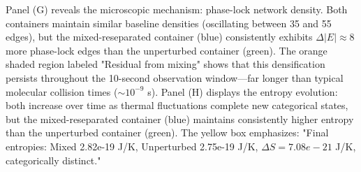 \documentclass[twocolumn,superscriptaddress,prb,10pt]{revtex4-2}
\theoremstyle{definition}
\theoremstyle{remark}
\begin{document}
Panel (G) reveals the microscopic mechanism: phase-lock network density. Both containers maintain similar baseline densities (oscillating between 35 and 55 edges), but the mixed-reseparated container (blue) consistently exhibits $\Delta |E| \approx 8$ more phase-lock edges than the unperturbed container (green). The orange shaded region labeled "Residual from mixing" shows that this densification persists throughout the 10-second observation window—far longer than typical molecular collision times ($\sim 10^{-9}$ s). Panel (H) displays the entropy evolution: both increase over time as thermal fluctuations complete new categorical states, but the mixed-reseparated container (blue) maintains consistently higher entropy than the unperturbed container (green). The yellow box emphasizes: "Final entropies: Mixed 2.82e-19 J/K, Unperturbed 2.75e-19 J/K, $\Delta S = 7.08e-21$ J/K, categorically distinct."
\end{document}
